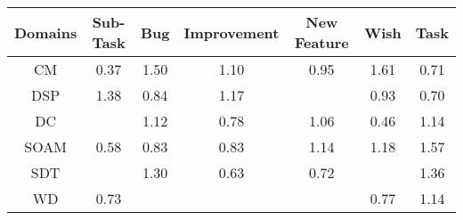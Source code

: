\begin{tabular}{|c||c|c|c|c|c|c|}
\hline
Domains & Sub-Task & Bug & Improvement & New Feature & Wish & Task \\ 
\hline
CM & \cellcolor[rgb]{0.76,0.13,0.28} 0.37 & \cellcolor[rgb]{0.5989128137357714,0.6926429117695759,0.42} 1.50 & \cellcolor[rgb]{0.8469629682893165,0.8101403534002025,0.42} 1.10 & \cellcolor[rgb]{0.8985063123090968,0.7855965449297246,0.40927255815515695} 0.95 & \cellcolor[rgb]{0.53,0.66,0.42} 1.61 & \cellcolor[rgb]{0.8416752978485309,0.5165964098163797,0.35623027799196216} 0.71 \\ 
\hline
DSP & \cellcolor[rgb]{0.6754658181590368,0.7289048612332281,0.42} 1.38 & \cellcolor[rgb]{0.872852223716164,0.6641671922565092,0.38532874213508633} 0.84 & \cellcolor[rgb]{0.8035788425823633,0.7895899780653299,0.42} 1.17 &  & \cellcolor[rgb]{0.8931654012738404,0.7603162326961777,0.4042877078555843} 0.93 & \cellcolor[rgb]{0.8398766323291422,0.5080827263579393,0.3545515235071993} 0.70 \\ 
\hline
DC &  & \cellcolor[rgb]{0.8353974156843798,0.8046619337452325,0.42} 1.12 & \cellcolor[rgb]{0.8586730970316889,0.5970526592833277,0.3720948905629097} 0.78 & \cellcolor[rgb]{0.8743164426055675,0.8230972622868477,0.42} 1.06 & \cellcolor[rgb]{0.7814466332349469,0.23151406397874846,0.30001685768595043} 0.46 & \cellcolor[rgb]{0.8246436579330916,0.7995680484946223,0.42} 1.14 \\ 
\hline
SOAM & \cellcolor[rgb]{0.8109420426495548,0.3711256685412259,0.3275459064729178} 0.58 & \cellcolor[rgb]{0.8693838460074933,0.647750204435468,0.3820915896069937} 0.83 & \cellcolor[rgb]{0.8694665528474212,0.6481416834777939,0.38216878265759313} 0.83 & \cellcolor[rgb]{0.825536624898322,0.7999910328465736,0.42} 1.14 & \cellcolor[rgb]{0.8012966880223846,0.7885089574842875,0.42000000000000004} 1.18 & \cellcolor[rgb]{0.5544191263299578,0.6715669545773485,0.42} 1.57 \\ 
\hline
SDT &  & \cellcolor[rgb]{0.7259691823785007,0.7528275074424476,0.42} 1.30 & \cellcolor[rgb]{0.8223033890180823,0.4249027080189229,0.33814982975021013} 0.63 & \cellcolor[rgb]{0.8437959688703451,0.5266342526529666,0.3582095709456554} 0.72 &  & \cellcolor[rgb]{0.686792153271371,0.7342699673390705,0.42} 1.36 \\ 
\hline
WD & \cellcolor[rgb]{0.8455380419585682,0.5348800652705563,0.35983550582799706} 0.73 &  &  &  & \cellcolor[rgb]{0.8557461626089563,0.5831985030157266,0.3693630851016926} 0.77 & \cellcolor[rgb]{0.8251145191705739,0.7997910880281666,0.42} 1.14 \\ 
\hline
\end{tabular}